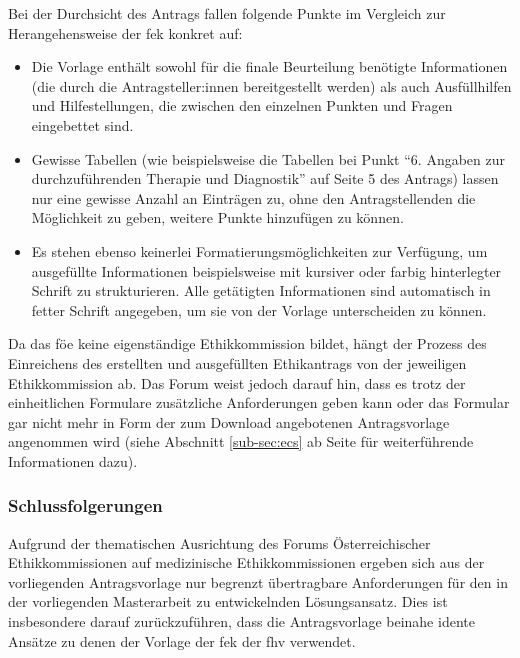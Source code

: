 \documentclass[a4paper,12pt,twoside,numbers=noendperiod]{scrreprt}
\begin{document}
Bei der Durchsicht des Antrags fallen folgende Punkte im Vergleich zur Herangehensweise der \ac{fek} konkret auf:
\begin{itemize}
    \item Die Vorlage enthält sowohl für die finale Beurteilung benötigte Informationen (die durch die Antragsteller:innen bereitgestellt werden) als auch Ausfüllhilfen und Hilfestellungen, die zwischen den einzelnen Punkten und Fragen eingebettet sind.
    \item Gewisse Tabellen (wie beispielsweise die Tabellen bei Punkt \enquote{6. Angaben zur durchzuführenden Therapie und Diagnostik} auf Seite 5 des Antrags) lassen nur eine gewisse Anzahl an Einträgen zu, ohne den Antragstellenden die Möglichkeit zu geben, weitere Punkte hinzufügen zu können.
    \item Es stehen ebenso keinerlei Formatierungsmöglichkeiten zur Verfügung, um ausgefüllte Informationen beispielsweise mit kursiver oder farbig hinterlegter Schrift zu strukturieren. Alle getätigten Informationen sind automatisch in fetter Schrift angegeben, um sie von der Vorlage unterscheiden zu können.
\end{itemize}

Da das \ac{föe} keine eigenständige Ethikkommission bildet, hängt der Prozess des Einreichens des erstellten und ausgefüllten Ethikantrags von der jeweiligen Ethikkommission ab. Das Forum weist jedoch darauf hin, dass es trotz der einheitlichen Formulare zusätzliche Anforderungen geben kann oder das Formular gar nicht mehr in Form der zum Download angebotenen Antragsvorlage angenommen wird (siehe Abschnitt \ref{sub-sec:ecs} ab Seite \pageref{sub-sec:ecs} für weiterführende Informationen dazu). \cite{ethikkommission_der_medizinischen_universitat_graz_download_2012}

\subsubsection*{Schlussfolgerungen}
\label{sub-sub-sec:schlussfolgerungen-föe}

Aufgrund der thematischen Ausrichtung des Forums Österreichischer Ethikkommissionen auf medizinische Ethikkommissionen ergeben sich aus der vorliegenden Antragsvorlage nur begrenzt übertragbare Anforderungen für den in der vorliegenden Masterarbeit zu entwickelnden Lösungsansatz. Dies ist insbesondere darauf zurückzuführen, dass die Antragsvorlage beinahe idente Ansätze zu denen der Vorlage der \acl{fek} der \acl{fhv} verwendet.
\end{document}
